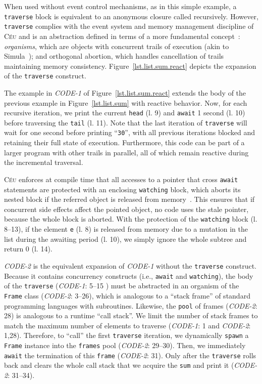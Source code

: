 \documentclass{sig-alternate}
\newcommand{\CEU}{\textsc{C\'{e}u}\xspace}
\newcommand{\code}[1] {{\small{\texttt{#1}}}}
\begin{document}
When used without event control mechanisms, as in this simple example, a 
\code{traverse} block is equivalent to an anonymous closure called recursively.
%
However, \code{traverse} complies with the event system and memory management 
discipline of \CEU and is an abstraction defined in terms of a more fundamental 
concept~\cite{ceu.mod15}:
\emph{organisms}, which are objects with concurrent trails of execution (akin 
to Simula~\cite{simula}); and orthogonal abortion, which handles cancellation 
of trails maintaining memory consistency.
%
Figure~\ref{lst.list.sum.react} depicts the expansion of the \code{traverse} 
construct.

The example in \emph{CODE-1} of Figure~\ref{lst.list.sum.react} extends the 
body of the previous example in Figure~\ref{lst.list.sum} with reactive 
behavior.
%
Now, for each recursive iteration, we print the current \code{head} (l. 9) 
and \code{await} 1 second (l. 10) before traversing the \code{tail} (l. 
11).
%
Note that the last iteration of \code{traverse} will wait for one second before 
printing ``\texttt{30}'', with all previous iterations blocked and
retaining their full state of execution.
Furthermore, this code can be part of a larger program with other trails in 
parallel, all of which remain reactive during the incremental traversal.

\CEU enforces at compile time that all accesses to a pointer that cross 
\code{await} statements are protected with an enclosing \code{watching} block, 
which aborts its nested block if the referred object is released from 
memory~\cite{ceu.mod15}.
%
This ensures that if concurrent side effects affect the pointed object, no code 
uses the stale pointer, because the whole block is aborted.
%
With the protection of the \code{watching} block (l. 8--13), if the element 
\code{e} (l. 8) is released from memory due to a mutation in the list during 
the awaiting period (l. 10), we simply ignore the whole subtree and return 0 
(l. 14).

\emph{CODE-2} is the equivalent expansion of \emph{CODE-1} without the 
\code{traverse} construct.
%
Because it contains concurrency constructs (i.e., \code{await} and 
\code{watching}), the body of the \code{traverse} (\emph{CODE-1}: 5--15 ) must 
be abstracted in an organism of the \code{Frame} class (\emph{CODE-2}: 3--26), 
which is analogous to a ``stack frame'' of standard programming languages with 
subroutines.
Likewise, the \code{pool} of frames (\emph{CODE-2}: 28) is analogous to a 
runtime ``call stack''.
We limit the number of stack frames to match the maximum number of elements to 
traverse (\emph{CODE-1}: 1 and \emph{CODE-2}: 1,28).
Therefore, to ``call'' the first \code{traverse} iteration, we dynamically 
\code{spawn} a \code{Frame} instance into the \code{frames} pool 
(\emph{CODE-2}: 29--30).
Then, we immediately \code{await} the termination of this \code{frame} 
(\emph{CODE-2}: 31).
Only after the \code{traverse} rolls back and clears the whole call stack
that we acquire the \code{sum} and print it (\emph{CODE-2}: 31--34).
\end{document}

